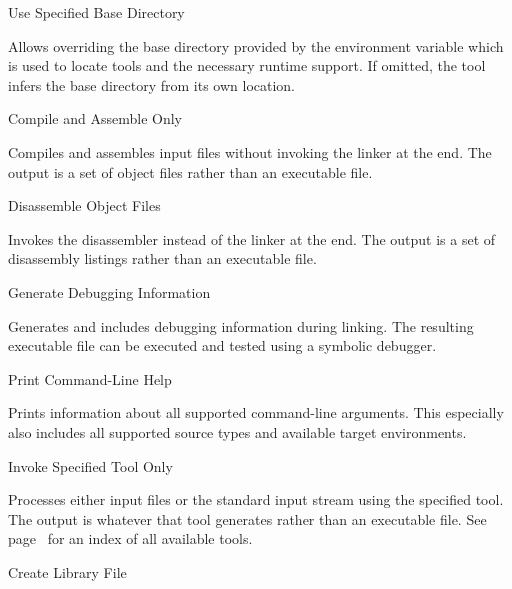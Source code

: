 \begin{description}

\item{}\alignright Use Specified Base Directory\nopagebreak

Allows overriding the base directory provided by the  environment variable which is used to locate tools and the necessary runtime support.
If omitted, the tool infers the base directory from its own location.

\item{}\alignright Compile and Assemble Only\nopagebreak

Compiles and assembles input files without invoking the linker at the end.
The output is a set of object files rather than an executable file.

\item{}\alignright Disassemble Object Files\nopagebreak

Invokes the disassembler instead of the linker at the end.
The output is a set of disassembly listings rather than an executable file.

\item{}\alignright Generate Debugging Information\nopagebreak

Generates and includes debugging information during linking.
The resulting executable file can be executed and tested using a symbolic debugger.

\item{}\alignright Print Command-Line Help\nopagebreak

Prints information about all supported command-line arguments.
This especially also includes all supported source types and available target environments.

\item{}\alignright Invoke Specified Tool Only\nopagebreak

Processes either input files or the standard input stream using the specified tool.
The output is whatever that tool generates rather than an executable file.
\ifbook See page~\pageref{idx:tools} for an index of all available tools. \fi

\item{}\alignright Create Library File\nopagebreak


\end{description}
